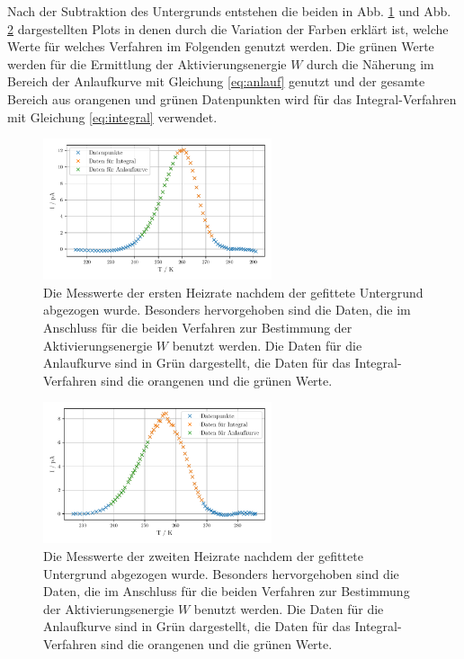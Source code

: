 Nach der Subtraktion des Untergrunds entstehen die beiden in Abb. \ref{abb:wo_bkg1} und Abb. \ref{abb:wo_bkg2} dargestellten Plots in denen durch die Variation der Farben erklärt ist, welche Werte für welches Verfahren im Folgenden genutzt werden. Die grünen Werte werden für die Ermittlung der Aktivierungsenergie $W$ durch die Näherung im Bereich der Anlaufkurve mit Gleichung \eqref{eq:anlauf} genutzt und der gesamte Bereich aus orangenen und grünen Datenpunkten wird für das Integral-Verfahren mit Gleichung \eqref{eq:integral} verwendet. 
\begin{figure}
    \centering
    \includegraphics[width=0.6\textwidth]{figures/data_wo_bkg1.pdf}
    \caption{Die Messwerte der ersten Heizrate nachdem der gefittete Untergrund abgezogen wurde. Besonders hervorgehoben sind die Daten, die im Anschluss für die beiden Verfahren zur Bestimmung der Aktivierungsenergie $W$ benutzt werden. Die Daten für die Anlaufkurve sind in Grün dargestellt, die Daten für das Integral-Verfahren sind die orangenen und die grünen Werte.}
    \label{abb:wo_bkg1}
\end{figure}
\begin{figure}
    \centering
    \includegraphics[width=0.6\textwidth]{figures/data_wo_bkg2.pdf}
    \caption{Die Messwerte der zweiten Heizrate nachdem der gefittete Untergrund abgezogen wurde. Besonders hervorgehoben sind die Daten, die im Anschluss für die beiden Verfahren zur Bestimmung der Aktivierungsenergie $W$ benutzt werden. Die Daten für die Anlaufkurve sind in Grün dargestellt, die Daten für das Integral-Verfahren sind die orangenen und die grünen Werte.}
    \label{abb:wo_bkg2}
\end{figure}
